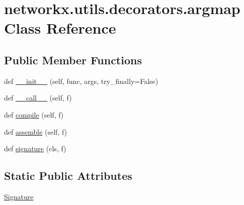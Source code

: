 \hypertarget{classnetworkx_1_1utils_1_1decorators_1_1argmap}{}\section{networkx.\+utils.\+decorators.\+argmap Class Reference}
\label{classnetworkx_1_1utils_1_1decorators_1_1argmap}
\subsection*{Public Member Functions}
\begin{DoxyCompactItemize}
\item 
def \hyperlink{classnetworkx_1_1utils_1_1decorators_1_1argmap_a8b280ba089372013289dbd0fb23e4c5d}{\+\_\+\+\_\+init\+\_\+\+\_\+} (self, func, args, try\+\_\+finally=False)
\item 
def \hyperlink{classnetworkx_1_1utils_1_1decorators_1_1argmap_abaf304b244dda496203fcbd471fec103}{\+\_\+\+\_\+call\+\_\+\+\_\+} (self, f)
\item 
def \hyperlink{classnetworkx_1_1utils_1_1decorators_1_1argmap_ae507473458a8ead357cd44bfd5803ce9}{compile} (self, f)
\item 
def \hyperlink{classnetworkx_1_1utils_1_1decorators_1_1argmap_a22a7a6a3b8f4b9f469061050ca1afc20}{assemble} (self, f)
\item 
def \hyperlink{classnetworkx_1_1utils_1_1decorators_1_1argmap_a336d69c01afde4f38cab25eaf8df929c}{signature} (cls, f)
\end{DoxyCompactItemize}
\subsection*{Static Public Attributes}
\begin{DoxyCompactItemize}
\item 
\hyperlink{classnetworkx_1_1utils_1_1decorators_1_1argmap_ad7f6fa78a07c0bf2eccc054492fd9677}{Signature}
\end{DoxyCompactItemize}


